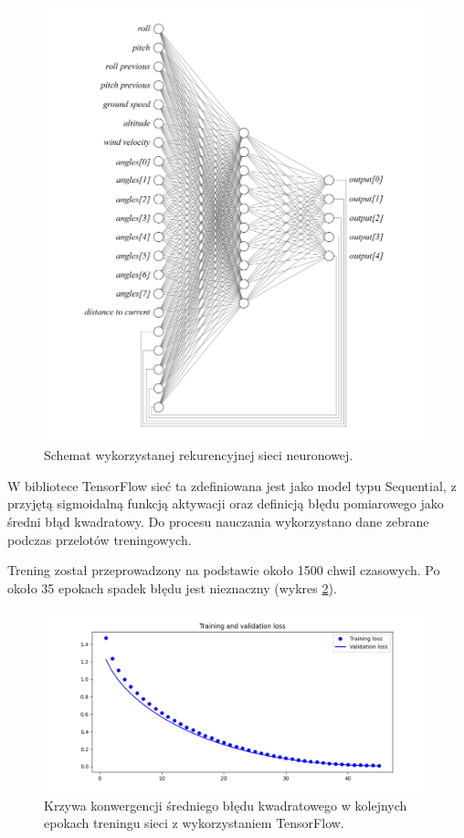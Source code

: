 \documentclass[12pt, a4paper]{article}
\begin{document}
 \begin{figure}[H]
    \centering
    \includegraphics[width=1\textwidth]{siec}
    \caption{Schemat wykorzystanej rekurencyjnej sieci neuronowej.}
    \label{fig:siec}
\end{figure}

W bibliotece TensorFlow sieć ta zdefiniowana jest jako model typu Sequential, z przyjętą sigmoidalną funkcją aktywacji oraz definicją błędu pomiarowego jako średni błąd kwadratowy. Do procesu nauczania wykorzystano dane zebrane podczas przelotów treningowych.

Trening został przeprowadzony na podstawie około 1500 chwil czasowych. Po około 35 epokach spadek błędu jest nieznaczny (wykres \ref{fig:tren1}).

 \begin{figure}[H]
    \centering
    \includegraphics[width=1\textwidth]{tfloss}
    \caption{Krzywa konwergencji średniego błędu kwadratowego w kolejnych epokach treningu sieci z wykorzystaniem TensorFlow.}
    \label{fig:tren1}
\end{figure}
\end{document}
